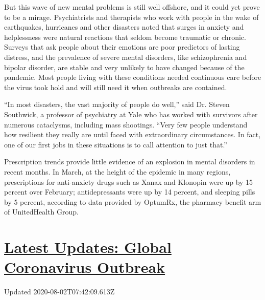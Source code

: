 But this wave of new mental problems is still well offshore, and it
could yet prove to be a mirage. Psychiatrists and therapists who work
with people in the wake of earthquakes, hurricanes and other disasters
noted that surges in anxiety and helplessness were natural reactions
that seldom become traumatic or chronic. Surveys that ask people about
their emotions are poor predictors of lasting distress, and the
prevalence of severe mental disorders, like schizophrenia and bipolar
disorder, are stable and very unlikely to have changed because of the
pandemic. Most people living with these conditions needed continuous
care before the virus took hold and will still need it when outbreaks
are contained.

``In most disasters, the vast majority of people do well,'' said Dr.
Steven Southwick, a professor of psychiatry at Yale who has worked with
survivors after numerous cataclysms, including mass shootings. ``Very
few people understand how resilient they really are until faced with
extraordinary circumstances. In fact, one of our first jobs in these
situations is to call attention to just that.''

Prescription trends provide little evidence of an explosion in mental
disorders in recent months. In March, at the height of the epidemic in
many regions, prescriptions for anti-anxiety drugs such as Xanax and
Klonopin were up by 15 percent over February; antidepressants were up by
14 percent, and sleeping pills by 5 percent, according to data provided
by OptumRx, the pharmacy benefit arm of UnitedHealth Group.

\hypertarget{latest-updates-global-coronavirus-outbreak}{%
\section{\texorpdfstring{\href{https://www.nytimes.com/2020/08/01/world/coronavirus-covid-19.html?action=click\&pgtype=Article\&state=default\&region=MAIN_CONTENT_1\&context=storylines_live_updates}{Latest
Updates: Global Coronavirus
Outbreak}}{Latest Updates: Global Coronavirus Outbreak}}\label{latest-updates-global-coronavirus-outbreak}}

Updated 2020-08-02T07:42:09.613Z

